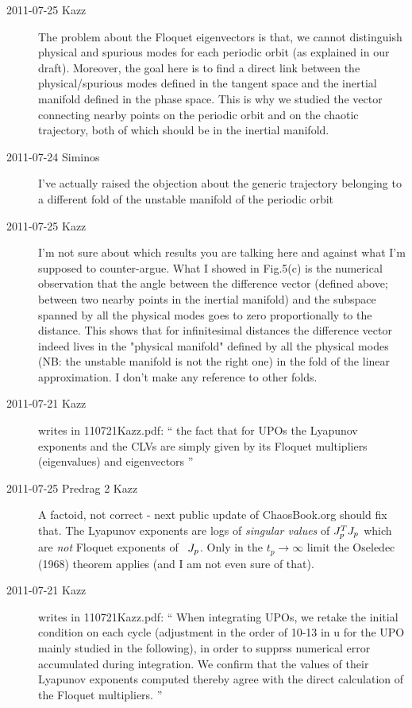 \begin{description}
\item[2011-07-25 Kazz]
The problem about the Floquet eigenvectors is that, we cannot distinguish
physical and spurious modes for each periodic orbit (as explained in our
draft). Moreover, the goal here is to find a direct link between the
physical/spurious modes defined in the tangent space and the inertial
manifold defined in the phase space. This is why we studied the vector
connecting nearby points on the periodic orbit and on the chaotic
trajectory, both of which should be in the inertial manifold.

\item[2011-07-24 Siminos]
    I've actually raised the objection about the generic trajectory
    belonging to a different fold of the unstable manifold of the
    periodic orbit

\item[2011-07-25 Kazz]
I'm not sure about which results you are talking here and against what
I'm supposed to counter-argue. What I showed in Fig.5(c) is the numerical
observation that the angle between the difference vector (defined above;
between two nearby points in the inertial manifold) and the subspace
spanned by all the physical modes goes to zero proportionally to the
distance. This shows that for infinitesimal distances the difference
vector indeed lives in the "physical manifold" defined by all the
physical modes (NB: the unstable manifold is not the right one) in the
fold of the linear approximation. I don't make any reference to other
folds.

\item[2011-07-21 Kazz] writes in 110721Kazz.pdf:
``
the fact that for UPOs the Lyapunov exponents and the
CLVs are simply given by its Floquet multipliers (eigenvalues)
and eigenvectors
''

\item[2011-07-25 Predrag 2 Kazz]
A factoid, not correct - next public update of ChaosBook.org should fix
that. The Lyapunov exponents are logs of \emph{singular values} of
$J^{T}_pJ_p$ which are \emph{not} Floquet exponents of
\jacobianM\ $J_p$. Only in the $t_p \to \infty$ limit the Oseledec
(1968) theorem applies (and I am not even sure of that).

\item[2011-07-21 Kazz] writes in 110721Kazz.pdf:
``
When integrating UPOs, we retake the initial condition on each cycle
(adjustment in the order of 10-13 in u for the UPO mainly studied in the
following), in order to supprss numerical error accumulated during
integration. We confirm that the values of their Lyapunov exponents
computed thereby agree with the direct calculation of the Floquet
multipliers.
''


\end{description}
